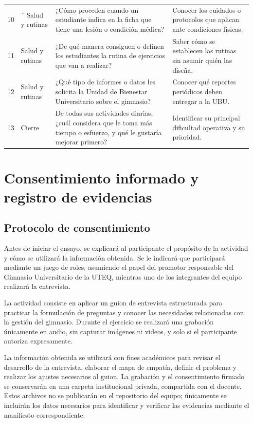 \documentclass[12pt,a4paper]{article}
\begin{document}
\begin{longtable}{>{\raggedright\arraybackslash}p{0.8cm} >{\raggedright\arraybackslash}p{2.9cm} >{\raggedright\arraybackslash}p{6.2cm} >{\raggedright\arraybackslash}p{4.0cm}}
\rowcolor{white}10 & ´{     } Salud y rutinas & ¿Cómo proceden cuando un estudiante indica en la ficha que tiene una lesión o condición médica? & Conocer los cuidados o protocolos que aplican ante condiciones físicas. \\
\rowcolor{azulS}11 & {      } Salud y rutinas & ¿De qué manera consiguen o definen los estudiantes la rutina de ejercicios que van a realizar? & Saber cómo se establecen las rutinas sin asumir quién las diseña. \\
\rowcolor{white}12 & {      } Salud y rutinas & ¿Qué tipo de informes o datos les solicita la Unidad de Bienestar Universitario sobre el gimnasio? & Conocer qué reportes periódicos deben entregar a la UBU. \\
\rowcolor{azulS}13 & Cierre & De todas sus actividades diarias, ¿cuál considera que le toma más tiempo o esfuerzo, y qué le gustaría mejorar primero? & Identificar su principal dificultad operativa y su prioridad. \\
\end{longtable}
\endgroup

\section{Consentimiento informado y registro de evidencias}


\subsection{Protocolo de consentimiento}

Antes de iniciar el ensayo, se explicará al participante el propósito de la actividad y cómo se utilizará la información obtenida. Se le indicará que participará mediante un juego de roles, asumiendo el papel del promotor responsable del Gimnasio Universitario de la UTEQ, mientras uno de los integrantes del equipo realizará la entrevista.

La actividad consiste en aplicar un guion de entrevista estructurada para practicar la formulación de preguntas y conocer las necesidades relacionadas con la gestión del gimnasio. Durante el ejercicio se realizará una grabación únicamente en audio, sin capturar imágenes ni videos, y solo si el participante autoriza expresamente.

La información obtenida se utilizará con fines académicos para revisar el desarrollo de la entrevista, elaborar el mapa de empatía, definir el problema y realizar los ajustes necesarios al guion. La grabación y el consentimiento firmado se conservarán en una carpeta institucional privada, compartida con el docente. Estos archivos no se publicarán en el repositorio del equipo; únicamente se incluirán los datos necesarios para identificar y verificar las evidencias mediante el manifiesto correspondiente.
\end{document}
